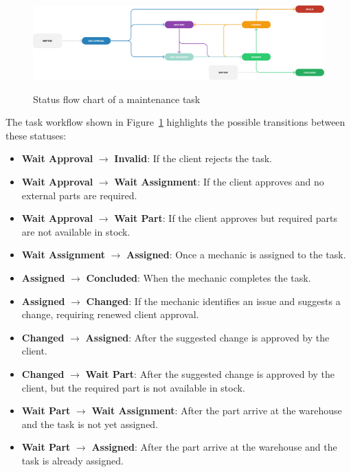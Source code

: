 \begin{figure}[h]
  \caption{Status flow chart of a maintenance task}
  \centering
  \includegraphics[width=\textwidth]{figs/Status/MaintenanceTask/StatusDiagram}
  \label{fig:maintenanceTaskFlowChart}
\end{figure}

The task workflow shown in Figure~\ref{fig:maintenanceTaskFlowChart} highlights the possible transitions between these statuses:
\begin{itemize}
\item \textbf{Wait Approval} $\rightarrow$ \textbf{Invalid}: If the client rejects the task.
\item \textbf{Wait Approval} $\rightarrow$ \textbf{Wait Assignment}: If the client approves and no external parts are required.
\item \textbf{Wait Approval} $\rightarrow$ \textbf{Wait Part}: If the client approves but required parts are not available in stock.
\item \textbf{Wait Assignment} $\rightarrow$ \textbf{Assigned}: Once a mechanic is assigned to the task.
\item \textbf{Assigned} $\rightarrow$ \textbf{Concluded}: When the mechanic completes the task.
\item \textbf{Assigned} $\rightarrow$ \textbf{Changed}: If the mechanic identifies an issue and suggests a change, requiring renewed client approval.
\item \textbf{Changed} $\rightarrow$ \textbf{Assigned}: After the suggested change is approved by the client.
\item \textbf{Changed} $\rightarrow$ \textbf{Wait Part}: After the suggested change is approved by the client, but the required part is not available in stock.
\item \textbf{Wait Part} $\rightarrow$ \textbf{Wait Assignment}: After the part arrive at the warehouse and the task is not yet assigned. 
\item \textbf{Wait Part} $\rightarrow$ \textbf{Assigned}: After the part arrive at the warehouse and the task is already assigned. 

\end{itemize}

